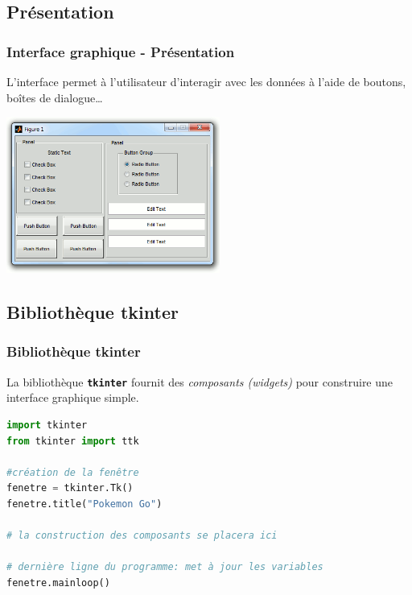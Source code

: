 \documentclass[svgnames,11pt]{beamer}
\begin{document}
\subsection{Présentation}
\begin{frame}
    \frametitle{Interface graphique - Présentation}

    L'interface permet à l'utilisateur d'interagir avec les données à l'aide de boutons, boîtes de dialogue\dots
    \begin{center}
        \centering
        \includegraphics[width=7cm]{ressources/interface.png}
        \label{IMG}
    \end{center}

\end{frame}
\subsection{Bibliothèque tkinter}
\begin{frame}[fragile]
    \frametitle{Bibliothèque tkinter}

    La bibliothèque \texttt{\textbf{tkinter}} fournit des \emph{composants (widgets)} pour construire une interface graphique simple.
    \begin{center}
        \begin{lstlisting}[language=Python,basicstyle=\ttfamily\small,xrightmargin=1em,xleftmargin=1em]
import tkinter
from tkinter import ttk

#création de la fenêtre
fenetre = tkinter.Tk()
fenetre.title("Pokemon Go")

# la construction des composants se placera ici

# dernière ligne du programme: met à jour les variables 
fenetre.mainloop()
\end{lstlisting}
        \label{interface}
    \end{center}

\end{frame}
\end{document}

